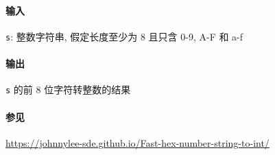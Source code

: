 \paragraph{输入}

\verb|s|: 整数字符串, 假定长度至少为 8 且只含 0-9, A-F 和 a-f

\paragraph{输出}

\verb|s| 的前 8 位字符转整数的结果

\paragraph{参见}

\url{https://johnnylee-sde.github.io/Fast-hex-number-string-to-int/}
